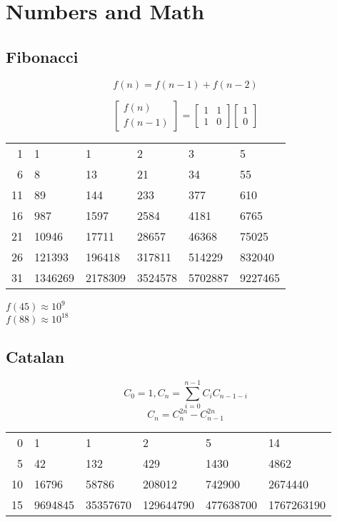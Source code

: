 \documentclass[twocolumn]{article}
\begin{document}
\section{Numbers and Math}

\subsection{Fibonacci}

$$f(n)=f(n-1)+f(n-2)$$

\begin{equation*}
    \begin{bmatrix}
        f(n) \\
        f(n - 1)
    \end{bmatrix}
    =
    \begin{bmatrix}
        1 & 1 \\
        1 & 0
    \end{bmatrix}
    \begin{bmatrix}
        1 \\
        0
    \end{bmatrix}
\end{equation*}

\begin{tabular}{r|lllll}
    1 & 1 & 1 & 2 & 3 & 5 \\
    6 & 8 & 13 & 21 & 34 & 55\\
    11 & 89 & 144 & 233 & 377 & 610 \\
    16 & 987 & 1597 & 2584 & 4181 & 6765\\
    21 & 10946 & 17711 & 28657 & 46368 & 75025 \\
    26 & 121393 & 196418 & 317811 & 514229 & 832040 \\
    31 & 1346269 & 2178309 & 3524578 & 5702887 & 9227465 \\
\end{tabular}

$f(45) \approx 10^9$\\
$f(88) \approx 10^{18}$

\subsection{Catalan}

$$C_0=1, C_n=\sum_{i=0}^{n-1} C_i C_{n-1-i}$$
$$C_n=C_n^{2n}-C_{n-1}^{2n}$$

\begin{tabular}{r|lllll}
    0 & 1 & 1 & 2 & 5 & 14 \\
    5 & 42 & 132 & 429 & 1430 & 4862 \\
    10 & 16796 & 58786 & 208012 & 742900 & 2674440 \\
    15 & 9694845 & 35357670 & 129644790 & 477638700 & 1767263190
\end{tabular}
\end{document}
